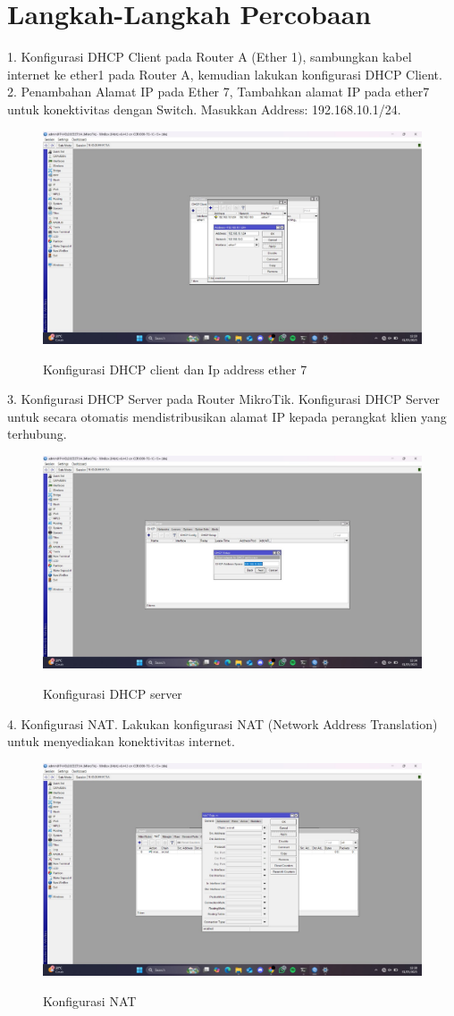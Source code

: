 \section{Langkah-Langkah Percobaan}
1. Konfigurasi DHCP Client pada Router A (Ether 1), sambungkan kabel internet ke ether1 pada Router A, kemudian lakukan konfigurasi DHCP Client. \\
2. Penambahan Alamat IP pada Ether 7, Tambahkan alamat IP pada ether7 untuk konektivitas dengan Switch. Masukkan Address: 192.168.10.1/24.
\begin{figure}[H]
    \centering
    \includegraphics[width=0.65\linewidth]{image/clnt1.jpg}
    \label{fig:inirujukan}
    \caption{Konfigurasi DHCP client dan Ip address ether 7}
\end{figure}
3. Konfigurasi DHCP Server pada Router MikroTik. Konfigurasi DHCP Server untuk secara otomatis mendistribusikan alamat IP kepada perangkat klien yang terhubung.
\begin{figure}[H]
    \centering
    \includegraphics[width=0.65\linewidth]{image/clnt2.jpg}
    \label{fig:inirujukan}
    \caption{Konfigurasi DHCP server}
\end{figure}
4. Konfigurasi NAT. Lakukan konfigurasi NAT (Network Address Translation) untuk menyediakan konektivitas internet.
\begin{figure}[H]
    \centering
    \includegraphics[width=0.65\linewidth]{image/clnt3.jpg}
    \label{fig:inirujukan}
    \caption{Konfigurasi NAT}
\end{figure}
